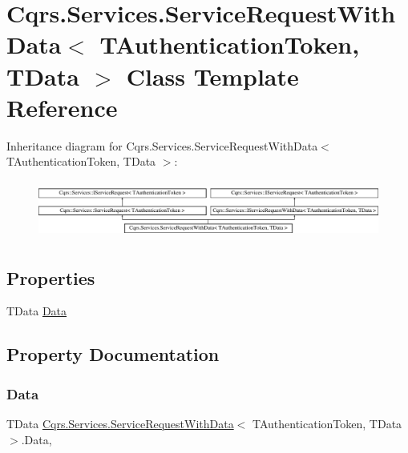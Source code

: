 \hypertarget{classCqrs_1_1Services_1_1ServiceRequestWithData}{}\section{Cqrs.\+Services.\+Service\+Request\+With\+Data$<$ T\+Authentication\+Token, T\+Data $>$ Class Template Reference}
\label{classCqrs_1_1Services_1_1ServiceRequestWithData}
Inheritance diagram for Cqrs.\+Services.\+Service\+Request\+With\+Data$<$ T\+Authentication\+Token, T\+Data $>$\+:\begin{figure}[H]
\begin{center}
\leavevmode
\includegraphics[height=1.926605cm]{classCqrs_1_1Services_1_1ServiceRequestWithData}
\end{center}
\end{figure}
\subsection*{Properties}
\begin{DoxyCompactItemize}
\item 
T\+Data \hyperlink{classCqrs_1_1Services_1_1ServiceRequestWithData_aab0d15e170d06c7170be934f9705937b}{Data}
\end{DoxyCompactItemize}


\subsection{Property Documentation}
\mbox{\label{classCqrs_1_1Services_1_1ServiceRequestWithData_aab0d15e170d06c7170be934f9705937b}} 
\subsubsection{\texorpdfstring{Data}{Data}}
{\footnotesize\ttfamily T\+Data \hyperlink{classCqrs_1_1Services_1_1ServiceRequestWithData}{Cqrs.\+Services.\+Service\+Request\+With\+Data}$<$ T\+Authentication\+Token, T\+Data $>$.Data\hspace{0.3cm}{\ttfamily [get]}, {\ttfamily [set]}}


